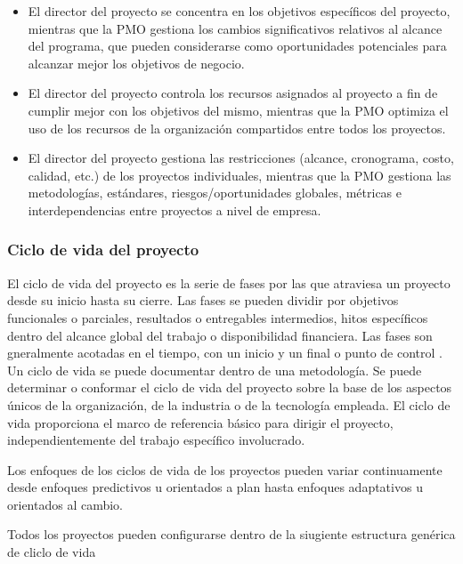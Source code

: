 \begin{itemize}

\item{El director del proyecto se concentra en los objetivos específicos del proyecto, mientras que la PMO gestiona los cambios significativos relativos al alcance del programa, que pueden considerarse como oportunidades potenciales para alcanzar mejor los objetivos de negocio.}

\item{El  director  del  proyecto  controla  los  recursos  asignados  al  proyecto  a  fin  de  cumplir  mejor  con  los  objetivos  del  mismo,  mientras  que  la  PMO  optimiza  el  uso  de  los  recursos  de  la  organización  compartidos entre todos los proyectos.}

\item{El  director  del  proyecto  gestiona  las  restricciones  (alcance,  cronograma,  costo,  calidad,  etc.)  de  los  proyectos  individuales,  mientras  que  la  PMO  gestiona  las  metodologías,  estándares,  riesgos/oportunidades globales, métricas e interdependencias entre proyectos a nivel de empresa.}

\end{itemize}


\subsubsection{Ciclo de vida del proyecto}

El ciclo de vida del proyecto es la serie de fases por las que atraviesa un proyecto desde su inicio hasta su cierre. Las fases se pueden dividir por objetivos funcionales o parciales, resultados o entregables intermedios, hitos específicos dentro del alcance global del trabajo o disponibilidad financiera. Las fases son gneralmente acotadas en el tiempo, con un inicio y un final o punto de control . Un ciclo de vida se puede documentar dentro de una metodología. Se puede determinar o conformar el ciclo de vida del proyecto sobre la base de los aspectos únicos de la organización, de la industria o de la tecnología empleada. El ciclo de vida proporciona el marco de referencia básico para dirigir el proyecto, independientemente del trabajo específico involucrado.

Los enfoques de los ciclos de vida de los proyectos pueden variar continuamente desde enfoques predictivos u orientados a plan hasta enfoques adaptativos u orientados al cambio.

Todos los proyectos pueden configurarse dentro de la siugiente estructura genérica de cliclo de vida

